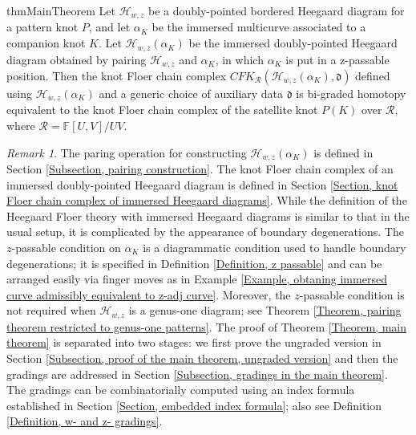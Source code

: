 \documentclass{amsart}
\theoremstyle{definition}
\theoremstyle{remark}
\newtheorem{rmk}[thm]{Remark}
\numberwithin{equation}{section}
\numberwithin{equation}{section} \makeatletter
\begin{document}
\begin{restatable}{thm}{MainTheorem}\label{Theorem, main theorem}
Let $\mathcal{H}_{w,z}$ be a doubly-pointed bordered Heegaard diagram for a pattern knot $P$, and let $\alpha_K$ be the immersed multicurve associated to a companion knot $K$. Let $\mathcal{H}_{w,z}(\alpha_{K})$ be the immersed doubly-pointed Heegaard diagram obtained by pairing $\mathcal{H}_{w,z}$ and $\alpha_K$, in which $\alpha_K$ is put in a z-passable position. Then the knot Floer chain complex $CFK_\mathcal{R}(\mathcal{H}_{w,z}(\alpha_{K}),\mathfrak{d})$ defined using $\mathcal{H}_{w,z}(\alpha_{K})$ and a generic choice of auxiliary data $\mathfrak{d}$ is bi-graded homotopy equivalent to the knot Floer chain complex of the satellite knot $P(K)$ over $\mathcal{R}$, where $\mathcal{R}=\mathbb{F}[U,V]/UV$. 
\end{restatable}
\begin{rmk}
The paring operation for constructing $\mathcal{H}_{w,z}(\alpha_K)$ is defined in Section \ref{Subsection, pairing construction}. The knot Floer chain complex of an immersed doubly-pointed Heegaard diagram is defined in Section \ref{Section, knot Floer chain complex of immersed Heegaard diagrams}. While the definition of the Heegaard Floer theory with immersed Heegaard diagrams is similar to that in the usual setup, it is complicated by the appearance of boundary degenerations.
The $z$-passable condition on $\alpha_K$ is a diagrammatic condition used to handle boundary degenerations; it is specified in Definition \ref{Definition, z passable} and can be arranged easily via finger moves as in Example \ref{Example, obtaning immersed curve admissibly equivalent to z-adj curve}. Moreover, the $z$-passable condition is not required when $\mathcal{H}_{w,z}$ is a genus-one diagram; see Theorem \ref{Theorem, pairing theorem restricted to genus-one patterns}. The proof of Theorem \ref{Theorem, main theorem} is separated into two stages: we first prove the ungraded version in Section \ref{Subsection, proof of the main theorem, ungraded version} and then the gradings are addressed in Section  \ref{Subsection, gradings in the main theorem}. The gradings can be combinatorially computed using an index formula established in Section \ref{Section, embedded index formula}; also see Definition \ref{Definition, w- and z- gradings}. 
\end{rmk}
\end{document}
